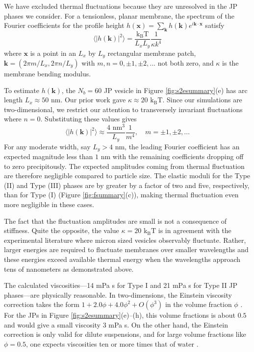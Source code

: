 \documentclass[prb,preprint,showpacs,preprintnumbers,amsmath,amssymb,longbibliography]{revtex4-1}
\newcommand{\kk}{\mathbf{k}}
\newcommand{\xx}{\mathbf{x}}
\newcommand{\kbt}{\mathrm{k}_{\text{B}}\mathrm{T}}
\begin{document}
We have excluded thermal fluctuations because they are unresolved in the JP phases we consider. 
For a tensionless, planar membrane, the spectrum of the Fourier coefficients for the 
profile height 
$h(\xx) = \sum_{\kk} h(\kk)e^{i \kk \cdot \xx}$ satisfy\cite{Merath2006FluctuationSO}  
\begin{equation}
\label{eq:fourier_spectrum}
\langle |h(\kk)|^2 \rangle = \frac{\kbt}{L_xL_y}\frac{1}{\kappa k^4}
\end{equation}
where $\xx$ is a point in an $L_x$ by $L_y$ rectangular membrane patch,
$\kk = \left(2\pi m/L_x, 2\pi n/L_y\right)$ with
$m, n = 0, \pm 1, \pm 2, \dots$ not both zero, and $\kappa$ is the membrane bending modulus.

To estimate $h(\kk)$, 
the $N_b = 60$ JP
vesicle in Figure \ref{fig:s2esummary}(e) 
has arc length $L_x \approx 50$ nm. 
Our prior work\cite{Fu20,Fu2022_JFM} gave $\kappa  \approx 20$ $\kbt$.
Since our simulations are two-dimensional, we restrict our attention
to transversely invariant fluctuations where $n = 0$.
Substituting these values gives 
\begin{equation}
\label{eq:fourier_spectrum_upper}
\langle |h(\kk)|^2 \rangle \approx \frac{4 \text{ nm}^3}{L_y}\frac{1}{m^4}, \quad m = \pm 1, \pm 2, \dots
\end{equation}
For any moderate width, say $L_y > 4$ nm, the leading Fourier coefficient
has an expected magnitude less than $1$ nm with the remaining coefficients
dropping off to zero precipitously.  The expected amplitudes coming from thermal
fluctuation are therefore negligible compared to particle size.
The elastic
moduli for the Type (II) and Type (III) phases are by greater by a factor of two
and five, respectively, than for Type (I) (Figure \ref{fig:fsummary}(c)), making thermal fluctuation even more negligible in these cases.

The fact that the fluctuation amplitudes are small 
is not a consequence of stiffness. Quite the opposite, the value $\kappa = 20$ $\kbt$
is in  agreement with the experimental literature where 
micron sized vesicles observably fluctuate. 
Rather, larger energies are required to fluctuate membranes 
over smaller wavelengths and these energies exceed available 
thermal energy when the wavelengths approach tens of nanometers
as demonstrated above.


The calculated viscosities---14 mPa s for Type I 
and 21 mPa s for Type II JP phases---are physically reasonable.
In two-dimensions, the Einstein viscosity correction 
takes the form $1 + 2.0 \phi + 4.0\phi^2 + O(\phi^3)$
in the volume fraction $\phi$
\cite{PhysRevFluids.1.043301,Haines2011APO,Khair2006TheC,Brady1983TheEV}.
For the JPs in Figure \ref{fig:s2esummary}(e)--(h), this volume fractions
is about $0.5$ and would give a small viscosity $3$ mPa s.
On the other hand, the Einstein correction is only valid for dilute
suspensions, and for large volume fractions like $\phi = 0.5$, 
one expects viscosities ten or more times that of water  
\cite{Konijn2014ExperimentalSO}.
\end{document}
